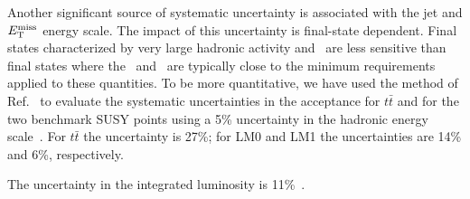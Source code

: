 Another significant source of systematic uncertainty is 
associated with the jet and $E_{\mathrm{T}}^{\text{miss}}$ energy scale.  The impact
of this uncertainty is final-state dependent.  Final
states characterized by very large hadronic activity and \MET\ are 
less sensitive than final states where the \MET\ and \HT\ 
are typically close to the minimum requirements applied to these quantities.  To be more quantitative,
we have used the method of Ref.~\cite{ref:top} to evaluate
the systematic uncertainties in the acceptance for $t\bar{t}$ 
and for the two benchmark SUSY points using a 5\% uncertainty in the hadronic 
energy scale~\cite{ref:jes}.
For $t\bar{t}$ the uncertainty is 27\%; for LM0 and LM1 the 
uncertainties are 14\% and 6\%, respectively.


The uncertainty in the integrated luminosity is 11\%~\cite{ref:lumi}.



